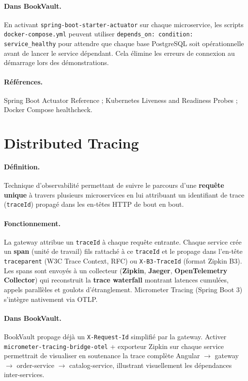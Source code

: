\documentclass[12pt,a4paper]{report}
\begin{document}
\paragraph{Dans BookVault.} En activant \texttt{spring-boot-starter-actuator} sur chaque microservice, les scripts \texttt{docker-compose.yml} peuvent utiliser \texttt{depends\_on: condition: service\_healthy} pour attendre que chaque base PostgreSQL soit opérationnelle avant de lancer le service dépendant. Cela élimine les erreurs de connexion au démarrage lors des démonstrations.\par

\paragraph{Références.} Spring Boot Actuator Reference ; Kubernetes Liveness and Readiness Probes ; Docker Compose healthcheck.\par


\section{Distributed Tracing}

\paragraph{Définition.} Technique d'observabilité permettant de suivre le parcours d'une \textbf{requête unique} à travers plusieurs microservices en lui attribuant un identifiant de trace (\texttt{traceId}) propagé dans les en-têtes HTTP de bout en bout.\par

\paragraph{Fonctionnement.} La gateway attribue un \texttt{traceId} à chaque requête entrante. Chaque service crée un \textbf{span} (unité de travail) fils rattaché à ce \texttt{traceId} et le propage dans l'en-tête \texttt{traceparent} (W3C Trace Context, RFC) ou \texttt{X-B3-TraceId} (format Zipkin B3). Les spans sont envoyés à un collecteur (\textbf{Zipkin}, \textbf{Jaeger}, \textbf{OpenTelemetry Collector}) qui reconstruit la \textbf{trace waterfall} montrant latences cumulées, appels parallèles et goulots d'étranglement. Micrometer Tracing (Spring Boot 3) s'intègre nativement via OTLP.\par

\paragraph{Dans BookVault.} BookVault propage déjà un \texttt{X-Request-Id} simplifié par la gateway. Activer \texttt{micrometer-tracing-bridge-otel} + exporteur Zipkin sur chaque service permettrait de visualiser en soutenance la trace complète Angular $\rightarrow$ gateway $\rightarrow$ order-service $\rightarrow$ catalog-service, illustrant visuellement les dépendances inter-services.\par
\end{document}
